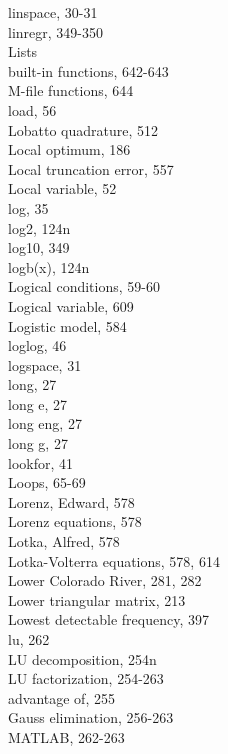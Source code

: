 \documentclass[../main.tex]{subfiles}
\begin{document}
\begin{multicols}{3}
    linspace, 30-31\\
    linregr, 349-350\\
    Lists\\
    \hspace*{3mm}built-in functions, 642-643\\
    \hspace*{3mm}M-file functions, 644\\
    load, 56\\
    Lobatto quadrature, 512\\
    Local optimum, 186\\
    Local truncation error, 557\\
    Local variable, 52\\
    log, 35\\
    log2, 124n\\
    log10, 349\\
    logb(x), 124n\\
    Logical conditions, 59-60\\
    Logical variable, 609\\
    Logistic model, 584\\
    loglog, 46\\
    logspace, 31\\
    long, 27\\
    long e, 27\\
    long eng, 27\\
    long g, 27\\
    lookfor, 41\\
    Loops, 65-69\\
    Lorenz, Edward, 578\\
    Lorenz equations, 578\\
    Lotka, Alfred, 578\\
    Lotka-Volterra equations, 578, 614\\
    Lower Colorado River, 281, 282\\
    Lower triangular matrix, 213\\
    Lowest detectable frequency, 397\\
    lu, 262\\
    LU decomposition, 254n\\
    LU factorization, 254-263\\
    \hspace*{3mm}advantage of, 255\\
    \hspace*{3mm}Gauss elimination, 256-263\\
    \hspace*{3mm}MATLAB, 262-263\\

\end{multicols}
\end{document}
